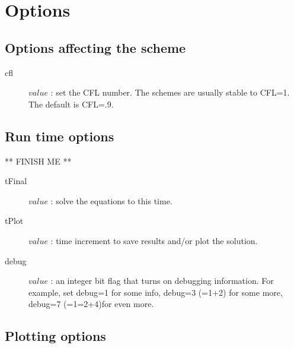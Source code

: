 \documentclass[11pt]{article}
\begin{document}
% 




\section{Options} \label{sec:option}

\subsection{Options affecting the scheme}

\begin{description}
  \item [\qquad cfl] $value$ : set the CFL number. The schemes are usually stable to CFL=1. The default is CFL=.9.
\end{description}


\subsection{Run time options}

** FINISH ME **

\begin{description}
  \item [\qquad tFinal] $value$ : solve the equations to this time.
  \item [\qquad tPlot] $value$ : time increment to save results and/or plot the solution.
  \item [\qquad debug] $value$ : an integer bit flag that turns on debugging information. For example, set debug=1 for some info, debug=3 (=1+2) for some
    more, debug=7 (=1=2+4)for even more. 
\end{description}

\subsection{Plotting options}
\end{document}
